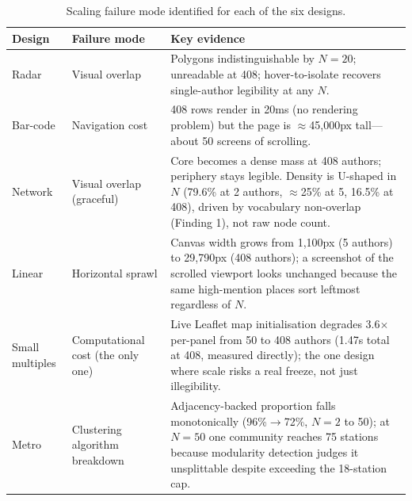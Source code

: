 \documentclass[logo,msc]{infthesis}
\begin{document}
\begin{table}[h]
\centering
\caption{Scaling failure mode identified for each of the six designs.}
\label{tab:scale-summary}
\small
\begin{tabular}{lp{3.2cm}p{6.8cm}}
\toprule
Design & Failure mode & Key evidence \\
\midrule
Radar & Visual overlap & Polygons indistinguishable by $N{=}20$; unreadable at 408; hover-to-isolate recovers single-author legibility at any $N$. \\
Bar-code & Navigation cost & 408 rows render in 20ms (no rendering problem) but the page is $\approx$45,000px tall---about 50 screens of scrolling. \\
Network & Visual overlap (graceful) & Core becomes a dense mass at 408 authors; periphery stays legible. Density is U-shaped in $N$ (79.6\% at 2 authors, $\approx$25\% at 5, 16.5\% at 408), driven by vocabulary non-overlap (Finding 1), not raw node count. \\
Linear & Horizontal sprawl & Canvas width grows from 1{,}100px (5 authors) to 29{,}790px (408 authors); a screenshot of the scrolled viewport looks unchanged because the same high-mention places sort leftmost regardless of $N$. \\
Small multiples & Computational cost (the only one) & Live Leaflet map initialisation degrades 3.6$\times$ per-panel from 50 to 408 authors (1.47s total at 408, measured directly); the one design where scale risks a real freeze, not just illegibility. \\
Metro & Clustering algorithm breakdown & Adjacency-backed proportion falls monotonically (96\%$\to$72\%, $N{=}2$ to 50); at $N{=}50$ one community reaches 75 stations because modularity detection judges it unsplittable despite exceeding the 18-station cap. \\
\bottomrule
\end{tabular}
\end{table}
\end{document}
